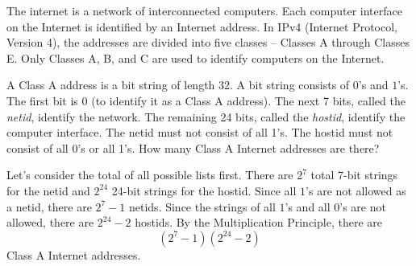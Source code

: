 \documentclass{article}
\theoremstyle{definition}
\begin{document}
\begin{question}
    The internet is a network of interconnected computers. Each computer interface on the Internet is identified by an Internet address. In IPv4 (Internet Protocol, Version 4), the addresses are divided into five classes -- Classes A through Classes E. Only Classes A, B, and C are used to identify computers on the Internet.
    
    A Class A address is a bit string of length 32. A bit string consists of $0$'s and $1$'s. The first bit is 0 (to identify it as a Class A address). The next 7 bits, called the \textit{netid}, identify the network. The remaining 24 bits, called the \textit{hostid}, identify the computer interface. The netid must not consist of all 1's. The hostid must not consist of all 0's or all 1's. How many Class A Internet addresses are there?
\end{question}
\begin{solution}
Let's consider the total of all possible lists first. There are $2^7$ total 7-bit strings for the netid and $2^{24}$ 24-bit strings for the hostid. Since all $1$'s are not allowed as a netid, there are $2^7-1$ netids. Since the strings of all $1$'s and all $0$'s are not allowed, there are $2^{24}-2$ hostids. By the Multiplication Principle, there are 
\[
(2^7-1)(2^{24}-2)
\]
Class A Internet addresses.
\end{solution}
\end{document}
